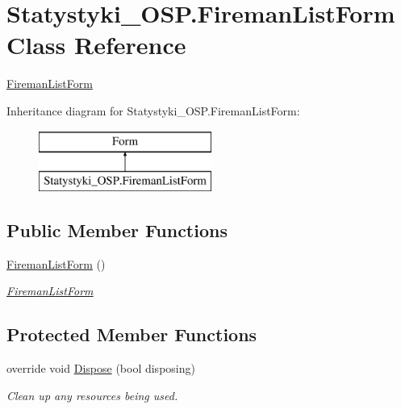 \hypertarget{class_statystyki___o_s_p_1_1_fireman_list_form}{}\section{Statystyki\+\_\+\+O\+S\+P.\+Fireman\+List\+Form Class Reference}
\label{class_statystyki___o_s_p_1_1_fireman_list_form}


\mbox{\hyperlink{class_statystyki___o_s_p_1_1_fireman_list_form}{Fireman\+List\+Form}}  


Inheritance diagram for Statystyki\+\_\+\+O\+S\+P.\+Fireman\+List\+Form\+:\begin{figure}[H]
\begin{center}
\leavevmode
\includegraphics[height=2.000000cm]{class_statystyki___o_s_p_1_1_fireman_list_form}
\end{center}
\end{figure}
\subsection*{Public Member Functions}
\begin{DoxyCompactItemize}
\item 
\mbox{\hyperlink{class_statystyki___o_s_p_1_1_fireman_list_form_a38107b6ae6fa4136207e7512a6650fc8}{Fireman\+List\+Form}} ()
\begin{DoxyCompactList}\small\item\em \mbox{\hyperlink{class_statystyki___o_s_p_1_1_fireman_list_form}{Fireman\+List\+Form}} \end{DoxyCompactList}\end{DoxyCompactItemize}
\subsection*{Protected Member Functions}
\begin{DoxyCompactItemize}
\item 
override void \mbox{\hyperlink{class_statystyki___o_s_p_1_1_fireman_list_form_a3dd2acec670d01d8e3af7bc9435efc54}{Dispose}} (bool disposing)
\begin{DoxyCompactList}\small\item\em Clean up any resources being used. \end{DoxyCompactList}\end{DoxyCompactItemize}
